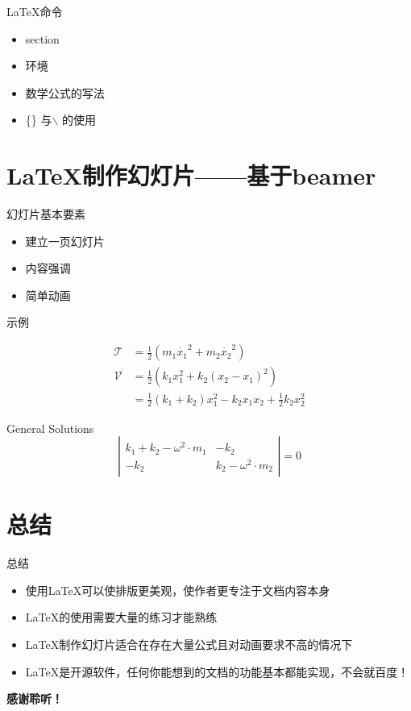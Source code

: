 \documentclass[12pt,UTF8]{beamer}
\begin{document}
	\begin{frame}{\LaTeX 命令}
		\begin{itemize}
			\item section
			\item 环境
			\item 数学公式的写法
			\item \{\} 与$\backslash$ 的使用
		\end{itemize}
	\end{frame}
\section{\LaTeX 制作幻灯片——基于beamer}
		\begin{frame}{幻灯片基本要素}
			\begin{itemize}
				\item 建立一页幻灯片
				\item 内容强调
				\item 简单动画
			\end{itemize}
		\end{frame}
		\begin{frame}{示例}
		\begin{block}{}
			\begin{equation*}
			\begin{aligned}
			\mathcal{T} &=\frac{1}{2}(m_1\dot{x_1}^2+m_2\dot{x_2}^2) \\
			\mathcal{V} &=\frac{1}{2}(k_1x_1^2+k_2(x_2-x_1)^2) \\
			&=\frac{1}{2}(k_1+k_2)x_1^2-k_2x_1x_2+\frac{1}{2}k_2x_2^2
			\end{aligned}
			\end{equation*}
		\end{block}
		\pause
		\begin{block}{General Solutions}
			\begin{equation*}
			\left|\begin{array}{cc} 
			k_1+k_2-\omega^2\cdot m_1 &   -k_2    \\ 
			-k_2 &  k_2-\omega^2\cdot m_2   
			\end{array}\right| 
			=0
			\end{equation*}	
		\end{block}
		\end{frame}
\section{总结}
\begin{frame}{总结}
	\begin{itemize}
		\item 使用\LaTeX 可以使排版更美观，使作者更专注于文档内容本身
		\item \LaTeX 的使用需要大量的练习才能熟练
		\item \LaTeX 制作幻灯片适合在存在大量公式且对动画要求不高的情况下
		\item \LaTeX 是开源软件，任何你能想到的文档的功能基本都能实现，不会就百度！
	\end{itemize}
\end{frame}
\begin{frame}
	\centering
	\Large{\textbf{感谢聆听！}} 
\end{frame}
\end{document}
